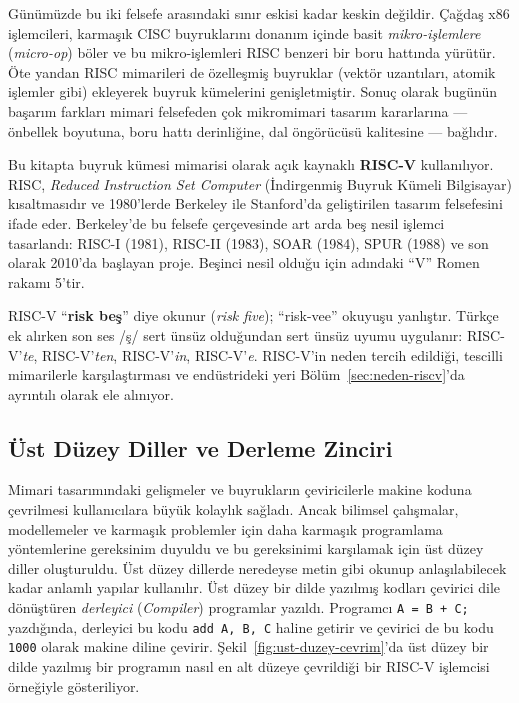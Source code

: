 Günümüzde bu iki felsefe arasındaki sınır eskisi kadar keskin değildir. Çağdaş x86 işlemcileri, karmaşık CISC buyruklarını donanım içinde basit \emph{mikro-işlemlere} (\emph{micro-op}) böler ve bu mikro-işlemleri RISC benzeri bir boru hattında yürütür. Öte yandan RISC mimarileri de özelleşmiş buyruklar (vektör uzantıları, atomik işlemler gibi) ekleyerek buyruk kümelerini genişletmiştir. Sonuç olarak bugünün başarım farkları mimari felsefeden çok mikromimari tasarım kararlarına --- önbellek boyutuna, boru hattı derinliğine, dal öngörücüsü kalitesine --- bağlıdır.

\begin{bilginot}
Bu kitapta buyruk kümesi mimarisi olarak açık kaynaklı \textbf{RISC-V} kullanılıyor. RISC, \emph{Reduced Instruction Set Computer} (İndirgenmiş Buyruk Kümeli Bilgisayar) kısaltmasıdır ve 1980'lerde Berkeley ile Stanford'da geliştirilen tasarım felsefesini ifade eder. Berkeley'de bu felsefe çerçevesinde art arda beş nesil işlemci tasarlandı: RISC-I (1981), RISC-II (1983), SOAR (1984), SPUR (1988) ve son olarak 2010'da başlayan proje. Beşinci nesil olduğu için adındaki ``V'' Romen rakamı 5'tir.

RISC-V ``\textbf{risk beş}'' diye okunur (\emph{risk five}); ``risk-vee'' okuyuşu yanlıştır. Türkçe ek alırken son ses /ş/ sert ünsüz olduğundan sert ünsüz uyumu uygulanır: RISC-V'\emph{te}, RISC-V'\emph{ten}, RISC-V'\emph{in}, RISC-V'\emph{e}. RISC-V'in neden tercih edildiği, tescilli mimarilerle karşılaştırması ve endüstrideki yeri Bölüm~\ref{sec:neden-riscv}'da ayrıntılı olarak ele alınıyor.
\end{bilginot}

\subsection{Üst Düzey Diller ve Derleme Zinciri}
\label{subsec:ust-duzey-diller}

Mimari tasarımındaki gelişmeler ve buyrukların çeviricilerle makine koduna çevrilmesi kullanıcılara büyük kolaylık sağladı. Ancak bilimsel çalışmalar, modellemeler ve karmaşık problemler için daha karmaşık programlama yöntemlerine gereksinim duyuldu ve bu gereksinimi karşılamak için üst düzey diller oluşturuldu. Üst düzey dillerde neredeyse metin gibi okunup anlaşılabilecek kadar anlamlı yapılar kullanılır. Üst düzey bir dilde yazılmış kodları çevirici dile dönüştüren \emph{derleyici} (\emph{Compiler}) programlar yazıldı. Programcı \texttt{A = B + C;} yazdığında, derleyici bu kodu \texttt{add A, B, C} haline getirir ve çevirici de bu kodu \texttt{1000} olarak makine diline çevirir. Şekil~\ref{fig:ust-duzey-cevrim}'da üst düzey bir dilde yazılmış bir programın nasıl en alt düzeye çevrildiği bir RISC-V işlemcisi örneğiyle gösteriliyor.

